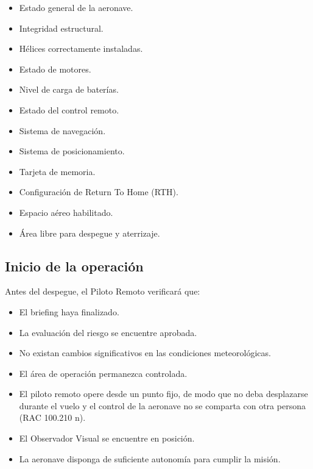 \begin{itemize}

\item Estado general de la aeronave.

\item Integridad estructural.

\item Hélices correctamente instaladas.

\item Estado de motores.

\item Nivel de carga de baterías.

\item Estado del control remoto.

\item Sistema de navegación.

\item Sistema de posicionamiento.

\item Tarjeta de memoria.

\item Configuración de Return To Home (RTH).

\item Espacio aéreo habilitado.

\item Área libre para despegue y aterrizaje.

\end{itemize}


\subsection{Inicio de la operación}

Antes del despegue, el Piloto Remoto verificará que:

\begin{itemize}

\item El briefing haya finalizado.

\item La evaluación del riesgo se encuentre aprobada.

\item No existan cambios significativos en las condiciones meteorológicas.

\item El área de operación permanezca controlada.

\item El piloto remoto opere desde un punto fijo, de modo que no deba desplazarse durante el vuelo y el control de la aeronave no se comparta con otra persona (RAC 100.210 n).

\item El Observador Visual se encuentre en posición.

\item La aeronave disponga de suficiente autonomía para cumplir la misión.

\end{itemize}

